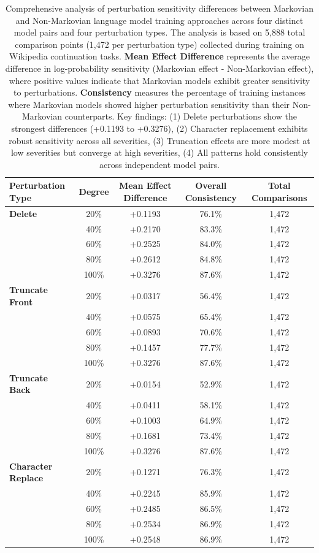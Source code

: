 \documentclass[letterpaper]{article} %
\begin{document}
\begin{table}[ht]
  \centering
\small
\begin{tabular}{lcccc}
\hline
\textbf{Perturbation Type} & \textbf{Degree} & \textbf{Mean Effect Difference} & \textbf{Overall Consistency} & \textbf{Total Comparisons} \\
\hline
\textbf{Delete} & 20\% & +0.1193 & 76.1\% & 1,472 \\
& 40\% & +0.2170 & 83.3\% & 1,472 \\
& 60\% & +0.2525 & 84.0\% & 1,472 \\
& 80\% & +0.2612 & 84.8\% & 1,472 \\
& 100\% & +0.3276 & 87.6\% & 1,472 \\
\hline
\textbf{Truncate Front} & 20\% & +0.0317 & 56.4\% & 1,472 \\
& 40\% & +0.0575 & 65.4\% & 1,472 \\
& 60\% & +0.0893 & 70.6\% & 1,472 \\
& 80\% & +0.1457 & 77.7\% & 1,472 \\
& 100\% & +0.3276 & 87.6\% & 1,472 \\
\hline
\textbf{Truncate Back} & 20\% & +0.0154 & 52.9\% & 1,472 \\
& 40\% & +0.0411 & 58.1\% & 1,472 \\
& 60\% & +0.1003 & 64.9\% & 1,472 \\
& 80\% & +0.1681 & 73.4\% & 1,472 \\
& 100\% & +0.3276 & 87.6\% & 1,472 \\
\hline
\textbf{Character Replace} & 20\% & +0.1271 & 76.3\% & 1,472 \\
& 40\% & +0.2245 & 85.9\% & 1,472 \\
& 60\% & +0.2485 & 86.5\% & 1,472 \\
& 80\% & +0.2534 & 86.9\% & 1,472 \\
& 100\% & +0.2548 & 86.9\% & 1,472 \\
\hline
\end{tabular}
\caption{Comprehensive analysis of perturbation sensitivity differences between Markovian and Non-Markovian language model training approaches across four distinct model pairs and four perturbation types. The analysis is based on 5,888 total comparison points (1,472 per perturbation type) collected during training on Wikipedia continuation tasks. \textbf{Mean Effect Difference} represents the average difference in log-probability sensitivity (Markovian effect - Non-Markovian effect), where positive values indicate that Markovian models exhibit greater sensitivity to perturbations. \textbf{Consistency} measures the percentage of training instances where Markovian models showed higher perturbation sensitivity than their Non-Markovian counterparts. Key findings: (1) Delete perturbations show the strongest differences (+0.1193 to +0.3276), (2) Character replacement exhibits robust sensitivity across all severities, (3) Truncation effects are more modest at low severities but converge at high severities, (4) All patterns hold consistently across independent model pairs.}
\label{tab:markovian_comparison}
\end{table}
\end{document}
